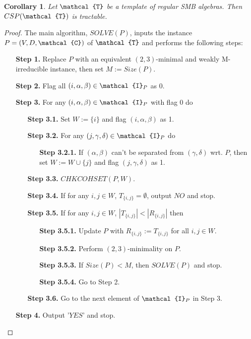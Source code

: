 \documentclass[11pt]{amsart}
\newcommand{\vr}[1]{{\uppercase {\mathcal{#1}}}}
\newtheorem{cor}[thm]{Corollary}
\theoremstyle{definition}
\begin{document}
\begin{cor}
Let $\vr t$ be a template of regular SMB algebras. Then $CSP(\vr t)$ is tractable.
\end{cor}

\begin{proof}
The main algorithm, $SOLVE(P)$, inputs the instance $P=(V,D,\vr c)$ of $\vr t$ and performs the following steps:
\begin{enumerate}
\item[{\bf Step 1.}] Replace $P$ with an equivalent $(2,3)$-minimal and weakly M-irredu\-cible instance, then set $M:=Size(P)$.
\item[{\bf Step 2.}] Flag all $(i,\alpha,\beta)\in \vr i_P$ as 0.
\item[{\bf Step 3.}] For any $(i,\alpha,\beta)\in \vr i_P$ with flag 0 do
\begin{enumerate}
\item[{\bf Step 3.1.}] Set $W:=\{i\}$ and flag $(i,\alpha,\beta)$ as 1.
\item[{\bf Step 3.2.}] For any $(j,\gamma,\delta)\in \vr i_P$ do
\begin{enumerate}
\item[{\bf Step 3.2.1.}] If $(\alpha,\beta)$ can't be separated from $(\gamma,\delta)$ wrt. $P$, then set $W:=W\cup\{j\}$ and flag $(j,\gamma,\delta)$ as 1.
\end{enumerate}
\item[{\bf Step 3.3.}] $CHKCOHSET(P,W)$.
\item[{\bf Step 3.4.}] If for any $i,j\in W$, $T_{\{i,j\}}=\emptyset$, output $NO$ and stop.
\item[{\bf Step 3.5.}] If for any $i,j\in W$, $|T_{\{i,j\}}|<|R_{\{i,j\}}|$ then
\begin{enumerate}
\item[{\bf Step 3.5.1.}] Update $P$ with $R_{\{i,j\}}:=T_{\{i,j\}}$ for all $i,j\in W$.
\item[{\bf Step 3.5.2.}] Perform $(2,3)$-minimality on $P$.
\item[{\bf Step 3.5.3.}] If $Size(P)<M$, then $SOLVE(P)$ and stop.
\item[{\bf Step 3.5.4.}] Go to Step 2.
\end{enumerate}
\item[{\bf Step 3.6.}] Go to the next element of $\vr i_P$ in Step 3.
\end{enumerate}
\item[{\bf Step 4.}] Output '$YES$' and stop.
\end{enumerate}

\end{proof}
\end{document}
